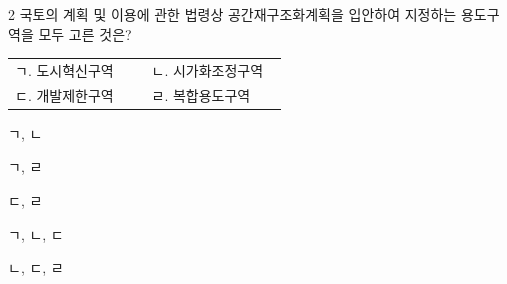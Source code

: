 \begin{question}{2}
국토의 계획 및 이용에 관한 법령상 공간재구조화계획을 입안하여 지정하는 용도구역을 모두 고른 것은?
\begin{framedtext}
\begin{tabular}{@{}p{0.46\linewidth}p{0.46\linewidth}@{}}
ㄱ. 도시혁신구역 & ㄴ. 시가화조정구역 \\
ㄷ. 개발제한구역 & ㄹ. 복합용도구역
\end{tabular}
\end{framedtext}
\begin{choices}
  \item ㄱ, ㄴ
  \item ㄱ, ㄹ
  \item ㄷ, ㄹ
  \item ㄱ, ㄴ, ㄷ
  \item ㄴ, ㄷ, ㄹ
\end{choices}
\end{question}
